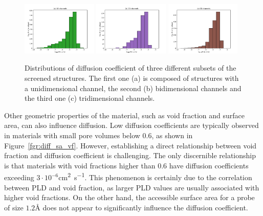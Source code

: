 \documentclass[main]{subfiles}
\begin{document}
\begin{figure}[ht]
  \centering
    \includegraphics[width=0.32\textwidth]{figures/5-diffusion/histogram_chan1D.pdf}
    \includegraphics[width=0.32\textwidth]{figures/5-diffusion/histogram_chan2D.pdf}
    \includegraphics[width=0.32\textwidth]{figures/5-diffusion/histogram_chan3D.pdf}
    \caption{ Distributions of diffusion coefficient of three different subsets of the screened structures. The first one (a) is composed of structures with a unidimensional channel, the second (b) bidimensional channels and the third one (c) tridimensional channels. }\label{fgr:hist_diffusion_chandim}
\end{figure}

Other geometric properties of the material, such as void fraction and surface area, can also influence diffusion. Low diffusion coefficients are typically observed in materials with small pore volumes below $0.6$, as shown in Figure~\ref{fgr:diff_sa_vf}. However, establishing a direct relationship between void fraction and diffusion coefficient is challenging. The only discernible relationship is that materials with void fractions higher than $0.6$ have diffusion coefficients exceeding $3\cdot10^{-6}$\si{\square\cm\per\s}. This phenomenon is certainly due to the correlation between PLD and void fraction, as larger PLD values are usually associated with higher void fractions. On the other hand, the accessible surface area for a probe of size $1.2$\si{\angstrom} does not appear to significantly influence the diffusion coefficient.
\end{document}
